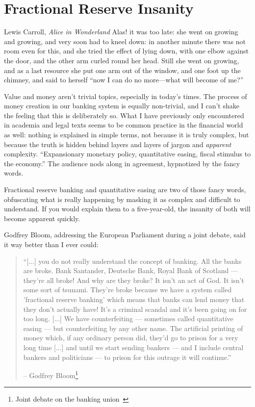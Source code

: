 \chapter{Fractional Reserve Insanity}
\label{les:13}

\begin{chapquote}{Lewis Carroll, \textit{Alice in Wonderland}}
Alas! it was too late: she went on growing and growing, and very soon had to
kneel down: in another minute there was not room even for this, and she tried
the effect of lying down, with one elbow against the door, and the other arm
curled round her head. Still she went on growing, and as a last resource she put
one arm out of the window, and one foot up the chimney, and said to herself
\enquote{now I can do no more—what will become of me?}
\end{chapquote}

Value and money aren't trivial topics, especially in today's times. The
process of money creation in our banking system is equally non-trivial,
and I can't shake the feeling that this is deliberately so. What I have
previously only encountered in academia and legal texts seems to be
common practice in the financial world as well: nothing is explained in
simple terms, not because it is truly complex, but because the truth is
hidden behind layers and layers of jargon and \textit{apparent} complexity.
\enquote{Expansionary monetary policy, quantitative easing, fiscal stimulus to
the economy.} The audience nods along in agreement, hypnotized by the
fancy words.

Fractional reserve banking and quantitative easing are two of those
fancy words, obfuscating what is really happening by masking it as
complex and difficult to understand. If you would explain them to a
five-year-old, the insanity of both will become apparent quickly.

Godfrey Bloom, addressing the European Parliament during a joint
debate, said it way better than I ever could:

\begin{quotation}\begin{samepage}
\enquote{[...] you do not really understand the concept of banking. All the
banks are broke. Bank Santander, Deutsche Bank, Royal Bank of
Scotland --- they're all broke! And why are they broke? It isn't an
act of God. It isn't some sort of tsunami. They're broke because we
have a system called 'fractional reserve banking' which means that
banks can lend money that they don't actually have! It's a criminal
scandal and it's been going on for too long. [...]
We have counterfeiting --- sometimes called quantitative
easing --- but counterfeiting by any other name. The artificial
printing of money which, if any ordinary person did, they'd go to
prison for a very long time [...] and until we start sending
bankers --- and I include central bankers and politicians --- to
prison for this outrage it will continue.}
\begin{flushright} -- Godfrey Bloom\footnote{Joint debate on the
banking union~\cite{godfrey-bloom}}
\end{flushright}\end{samepage}\end{quotation}

